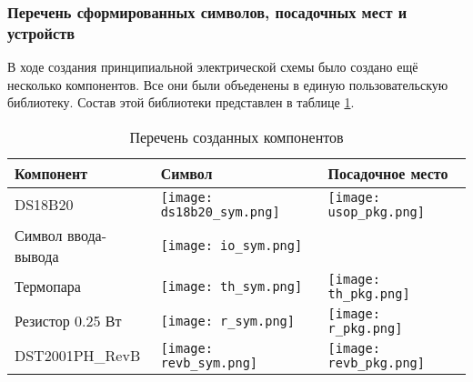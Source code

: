 \subsubsection{Перечень сформированных символов, посадочных мест и устройств}
В ходе создания принципиальной электрической схемы было создано ещё несколько
компонентов. Все они были объеденены в единую пользовательскую библиотеку.
Состав этой библиотеки представлен в таблице \ref{table:eagleUserLib}.
\
\begin{longtable}{|p{6cm}|p{6cm}|p{4cm}|}
\caption{Перечень созданных компонентов} \label{table:eagleUserLib} \\
\hline
Компонент & Символ & Посадочное место \\
\hline
\endhead
DS18B20 & \texttt{[image: ds18b20\_sym.png]} & \texttt{[image: usop\_pkg.png]}  \\
\hline
Символ ввода-вывода & \texttt{[image: io\_sym.png]} & \\
\hline
Термопара & \texttt{[image: th\_sym.png]} & \texttt{[image: th\_pkg.png]} \\
\hline
Резистор 0.25 Вт & \texttt{[image: r\_sym.png]} & \texttt{[image: r\_pkg.png]}  \\
\hline
DST2001PH\_RevB & \texttt{[image: revb\_sym.png]} & \texttt{[image: revb\_pkg.png]} \\
\hline
\end{longtable}
